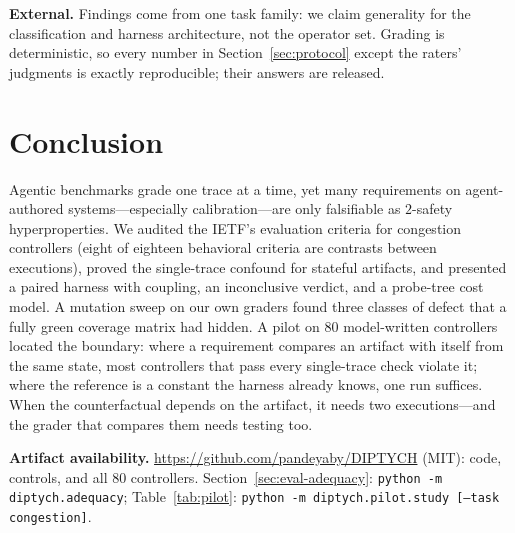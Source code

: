 \documentclass[conference]{IEEEtran}
\begin{document}
	\textbf{External.} Findings come from one task family: we claim
	generality for the classification and harness architecture, not the
	operator set. Grading is deterministic, so every number in
	Section~\ref{sec:protocol} except the raters' judgments is exactly
	reproducible; their answers are released.
	
	\section{Conclusion}
	\label{sec:conclusion}
	
	Agentic benchmarks grade one trace at a time, yet many requirements on
	agent-authored systems---especially calibration---are only falsifiable as
	$2$-safety hyperproperties. We audited the IETF's evaluation criteria for
	congestion controllers (eight of eighteen behavioral criteria are
	contrasts between executions), proved the single-trace
	confound for stateful artifacts, and presented a paired harness with
	coupling, an inconclusive verdict, and a probe-tree cost model. A mutation
	sweep on our own graders found three classes of defect that a fully green
	coverage matrix had hidden. A pilot on 80 model-written controllers
	located the boundary: where a requirement compares an artifact with
	itself from the same state, most controllers that pass every
	single-trace check violate it; where the reference is a constant the
	harness already knows, one run suffices. When the counterfactual depends
	on the artifact, it needs two executions---and the grader that compares
	them needs testing too.
	
	{\raggedright\textbf{Artifact availability.}
	\url{https://github.com/pandeyaby/DIPTYCH} (MIT): code, controls, and all 80
	controllers. Section~\ref{sec:eval-adequacy}: \texttt{python -m
	diptych.adequacy}; Table~\ref{tab:pilot}: \texttt{python -m
	diptych.pilot.study [--task congestion]}.\par}
	
	\balance
	
	
	
	
\end{document}
